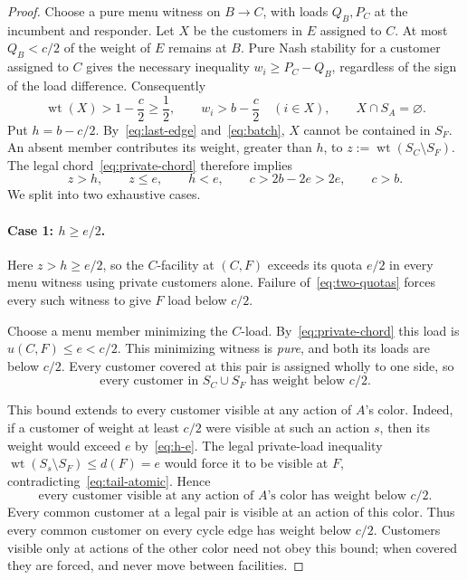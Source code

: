 \documentclass[11pt]{article}
\theoremstyle{definition}
\theoremstyle{remark}
\newcommand{\wt}{\operatorname{wt}}
\begin{document}
\begin{proof}
Choose a pure menu witness on $B\to C$, with loads $Q_B,P_C$ at the incumbent and responder. Let $X$ be the customers in $E$ assigned to $C$. At most $Q_B<c/2$ of the weight of $E$ remains at $B$. Pure Nash stability for a customer assigned to $C$ gives the necessary inequality $w_i\ge P_C-Q_B$, regardless of the sign of the load difference. Consequently
\begin{equation}\label{eq:batch}
 \wt(X)>1-\frac c2\ge\frac12,\qquad
 w_i>b-\frac c2\quad(i\in X),\qquad X\cap S_A=\varnothing.
\end{equation}
Put $h=b-c/2$. By~\eqref{eq:last-edge} and~\eqref{eq:batch}, $X$ cannot be contained in $S_F$. An absent member contributes its weight, greater than $h$, to $z:=\wt(S_C\setminus S_F)$. The legal chord~\eqref{eq:private-chord} therefore implies
\begin{equation}\label{eq:h-e}
 z>h,\qquad z\le e,\qquad
 h<e,\qquad c>2b-2e>2e,\qquad c>b.
\end{equation}
We split into two exhaustive cases.

\paragraph{Case 1: $h\ge e/2$.}
Here $z>h\ge e/2$, so the $C$-facility at $(C,F)$ exceeds its quota $e/2$ in every menu witness using private customers alone. Failure of~\eqref{eq:two-quotas} forces every such witness to give $F$ load below $c/2$.

Choose a menu member minimizing the $C$-load. By~\eqref{eq:private-chord} this load is $u(C,F)\le e<c/2$. This minimizing witness is \emph{pure}, and both its loads are below $c/2$. Every customer covered at this pair is assigned wholly to one side, so
\begin{equation}\label{eq:tail-atomic}
 \text{every customer in }S_C\cup S_F\text{ has weight below }c/2.
\end{equation}

This bound extends to every customer visible at any action of $A$'s color. Indeed, if a customer of weight at least $c/2$ were visible at such an action $s$, then its weight would exceed $e$ by~\eqref{eq:h-e}. The legal private-load inequality $\wt(S_s\setminus S_F)\le d(F)=e$ would force it to be visible at $F$, contradicting~\eqref{eq:tail-atomic}. Hence
\begin{equation}\label{eq:one-color-atomic}
 \text{every customer visible at any action of }A\text{'s color has weight below }c/2.
\end{equation}
Every common customer at a legal pair is visible at an action of this color. Thus every common customer on every cycle edge has weight below $c/2$. Customers visible only at actions of the other color need not obey this bound; when covered they are forced, and never move between facilities.


\end{proof}
\end{document}
